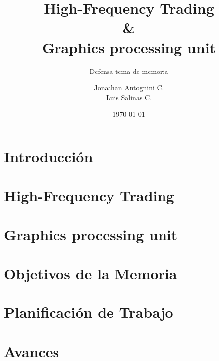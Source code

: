 \documentclass{beamer}
\title{High-Frequency Trading \\ \& \\ Graphics processing unit}
\subtitle{Defensa tema de memoria}
\author{Jonathan Antognini C.\\
		Luis Salinas C.}
\institute[]{Universidad Técnica Federico Santa María}
\date{\today}
\begin{document}
    \frame{\titlepage}
    \frame{\tableofcontents}
	\section{Introducción}
		
	\section{High-Frequency Trading}
		
	\section{Graphics processing unit}
		
	\section{Objetivos de la Memoria}
		
	\section{Planificación de Trabajo}
		
	\section{Avances}
		
\end{document}
